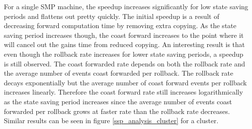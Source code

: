 \documentclass[11pt]{book}
\begin{document}
For a single SMP machine, the speedup increases significantly for low state saving periods and
flattens out pretty quickly.  The initial speedup is a result of decreasing forward computation
time by removing extra copying.  As the state saving period increases though, the coast forward 
increases to the point where it will cancel out the gains time from reduced copying.  An interesting
result is that even though the rollback rate increases for lower state saving periods, a speedup
is still observed.  The coast forwarded rate depends on both the rollback rate and the
average number of events coast forwarded per rollback.  The rollback rate decays exponentially
but the average number of coast forward events per rollback increases linearly.  Therefore the
coast forward rate still increases logarithmically as the state saving period increases since
the average number of events coast forwarded per rollback grows at faster rate than the rollback
rate decreases.  Similar results can be seen in figure \ref{ssp_analysis_cluster} for a cluster.
\end{document}
